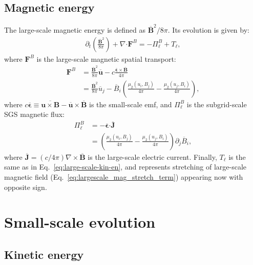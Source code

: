 \documentclass[]{article}
\newcommand{\bcdot}{\bm{\cdot}}
\begin{document}
\subsection{Magnetic energy}

The large-scale magnetic energy is defined as $\overline{\bm B}^2 / 8\pi$. Its evolution is given by:
%
\begin{align}
	\partial_t \left( \frac{\overline{\bm B}^2}{8\pi}\right) + \nabla \bcdot \bm F^{B} = - \Pi^B_{\ell} + T_{\ell} ,
\end{align}
%
where $\bm F^{B}$ is the large-scale magnetic spatial transport:
\begin{align}
	\bm F^{B} &= \frac{\overline{\bm B}^2}{8\pi} \overline{\bm u} - c\frac{\overline{\bm  \epsilon} \times \overline{\bm B}}{4 \pi} \nonumber \\
	&= \frac{\overline{\bm B}^2}{8\pi} \overline{u}_j - \overline{B}_i \left( \frac{\mu_2 (u_i, B_j)}{4\pi} - \frac{\mu_2 (u_j, B_i)}{4\pi} \right),
\end{align}
%
where $c \overline{\bm  \epsilon} \equiv \overline{\bm u \times \bm B} - \overline{\bm u} \times \overline{\bm B}$ is the small-scale emf, and $\Pi^B_{\ell}$ is the subgrid-scale SGS magnetic flux:
%
\begin{align}
	\Pi^B_{\ell} &= - \overline{\bm  \epsilon} \bcdot \overline{\bm J} \nonumber \\
	&= \left( \frac{\mu_2 (u_i, B_j)}{4\pi} - \frac{\mu_2 (u_j, B_i)}{4\pi} \right) \partial_j \overline{B}_i ,
\end{align}
%
where $\overline{\bm J} = (c/ 4\pi) \nabla \times \overline{\bm B}$ is the large-scale electric current. Finally, $T_{\ell}$ is the same as in Eq.~\eqref{eq:large-scale-kin-en}, and represents stretching of large-scale magnetic field (Eq.~\ref{eq:largescale_mag_stretch_term}) appearing now with opposite sign.


\section{Small-scale evolution}

\subsection{Kinetic energy}
\end{document}
